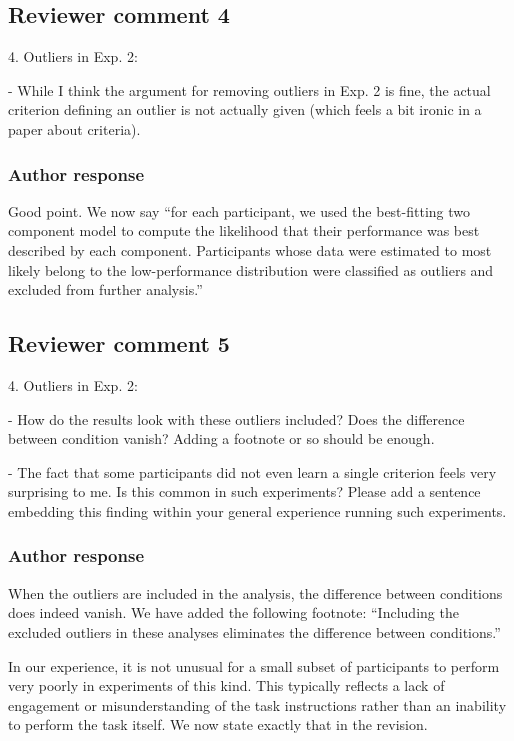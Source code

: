 \documentclass[12pt]{article}
\begin{document}
\subsection{Reviewer comment 4}
4. Outliers in Exp. 2:

- While I think the argument for removing outliers in Exp. 2
is fine, the actual criterion defining an outlier is not
actually given (which feels a bit ironic in a paper about
criteria).

\subsubsection{Author response}
Good point. We now say ``for each participant, we used the
best-fitting two component model to compute the likelihood
that their performance was best described by each component.
Participants whose data were estimated to most likely belong
to the low-performance distribution were classified as
outliers and excluded from further analysis.''

\subsection{Reviewer comment 5}
4. Outliers in Exp. 2:

- How do the results look with these outliers included? Does
the difference between condition vanish? Adding a footnote
or so should be enough.

- The fact that some participants did not even learn a
single criterion feels very surprising to me. Is this common
in such experiments? Please add a sentence embedding this
finding within your general experience running such
experiments.

\subsubsection{Author response}
When the outliers are included in the analysis, the
difference between conditions does indeed vanish. We have
added the following footnote: ``Including the excluded
outliers in these analyses eliminates the difference between
conditions.''

In our experience, it is not unusual for a small subset of
participants to perform very poorly in experiments of this
kind. This typically reflects a lack of engagement or
misunderstanding of the task instructions rather than an
inability to perform the task itself. We now state exactly
that in the revision.
\end{document}
